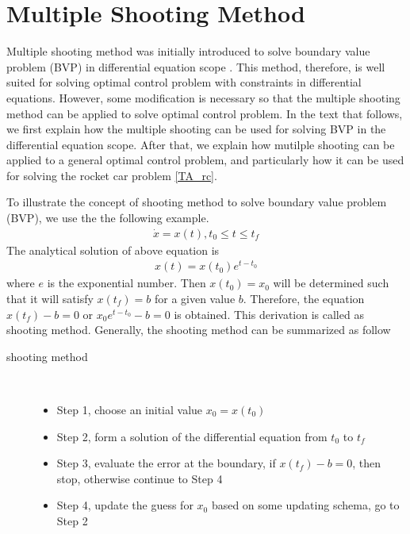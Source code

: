 	\section{Multiple Shooting Method}
	Multiple shooting method was initially introduced to solve boundary value problem (BVP) in differential equation scope \cite{DJJ62}. This method, therefore, is well suited for solving optimal control problem with constraints in differential equations. However, some modification is necessary so that the multiple shooting method can be applied to solve optimal control problem. In the text that follows, we first explain how the multiple shooting can be used for solving BVP in the differential equation scope. After that, we explain how mutilple shooting can be applied to a general optimal control problem, and particularly how it can be used for solving the rocket car problem \ref{TA_rc}.
	
	To illustrate the concept of shooting method to solve boundary value problem (BVP), we use the the following example.
	\begin{align*}
		\dot{x} = x(t), t_0 \leq t \leq t_f	
	\end{align*}
	The analytical solution of above equation is 
	\begin{align*}
		x(t) = x(t_0)e^{t - t_0}
	\end{align*}
	where $e$ is the exponential number. Then $x(t_0) = x_0$ will be determined such that it will satisfy $x(t_f)=b$ for a given value $b$. Therefore, the equation $x(t_f)-b = 0$ or $x_0e^{t - t_0}-b =0$ is obtained. This derivation is called as shooting method. Generally, the shooting method can be summarized as follow
	\begin{description}
		\item[shooting method] \
		\begin{itemize}
			\item Step 1, choose an initial value $x_0 = x(t_0)$ 
			\item Step 2, form a solution of the differential equation from $t_0$ to $t_f$
			\item Step 3, evaluate the error at the boundary, if $x(t_f) - b = 0$, then stop, otherwise continue to Step 4 
			\item Step 4, update the guess for $x_0$ based on some updating schema, go to Step 2
		\end{itemize}
	\end{description}
	

